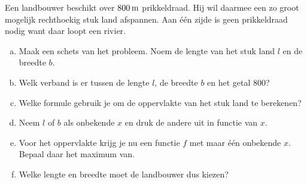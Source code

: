\documentclass[12pt]{article}
\begin{document}
\begin{oefening}
Een landbouwer beschikt over $800 \m$ prikkeldraad. Hij wil daarmee een zo groot mogelijk rechthoekig stuk land afspannen. Aan één zijde is geen prikkeldraad nodig want daar loopt een rivier.
\begin{enumerate}[(a)]
  \item Maak een schets van het probleem. Noem de lengte van het stuk land $l$ en de breedte $b$.
  \item Welk verband is er tussen de lengte $l$, de breedte $b$ en het getal $800$?
  \item Welke formule gebruik je om de oppervlakte van het stuk land te berekenen?
  \item Neem $l$ of $b$ als onbekende $x$ en druk de andere uit in functie van $x$.
  \item Voor het oppervlakte krijg je nu een functie $f$ met maar één onbekende $x$. Bepaal daar het maximum van.
  \item Welke lengte en breedte moet de landbouwer dus kiezen?
\end{enumerate}
\end{oefening}
\end{document}
